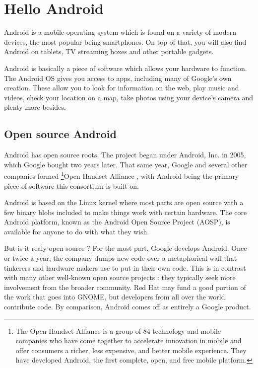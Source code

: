 
\chapter{Hello Android}
Android\cite{Todd2017} is a mobile operating system which is found on a variety of modern devices, the most popular being smartphones. On top of that, you will also find Android on tablets, TV streaming boxes and other portable gadgets.

Android is basically a piece of software which allows your hardware to function. The Android OS gives you access to apps, including many of Google's own creation. These allow you to look for information on the web, play music and videos, check your location on a map, take photos using your device's camera and plenty more besides.

\section{Open source Android}
Android has open source roots. The project began under Android, Inc. in 2005, which Google bought two years later. That same year, Google and several other companies formed  \footnote{The Open Handset Alliance is a group of 84 technology and mobile companies who have come together to accelerate innovation in mobile and offer consumers a richer, less expensive, and better mobile experience. They have developed Android, the first complete, open, and free mobile platform.}{Open Handset Alliance} \cite{alliance}, with Android being the primary piece of software this consortium is built on.

Android is based on the Linux kernel where most parts are open source with a few binary blobs included to make things work with certain hardware. The core Android platform, known as the Android Open Source Project (AOSP), is available for anyone to do with what they wish.

But is it realy open source ? For the most part, Google develops Android. Once or twice a year, the company dumps  new code over a metaphorical wall that tinkerers and hardware makers use to put in their own code. This is in contrast with many other well-known open source projects : they typically seek more involvement from the broader community. Red Hat may fund a good portion of the work that goes into GNOME, but developers from all over the world contribute code. By comparison, Android comes off as entirely a Google product.



